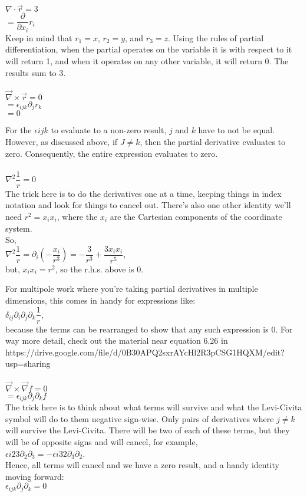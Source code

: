\documentclass[prb,preprint]
{revtex4-1}
\begin{document}
$\nabla \cdot \vec{r} = 3$\\
$= \dfrac{\partial}{\partial x_i} r_i$\\
Keep in mind that $r_1 = x$, $r_2 = y$, and $r_3 = z$.  Using the rules of partial differentiation, when the partial operates on the variable it is with respect to it will return 1, and when it operates on any other variable, it will return 0.  The results sum to 3.\\\\

$\vec{\nabla} \times \vec{r} = 0$\\
$=\epsilon_{ijk} \partial_j r_k$\\
$= 0$

For the $\epsilon{ijk}$ to evaluate to a non-zero result, $j$ and $k$ have to not be equal.  However, as discussed above, if $J \ne k$, then the partial derivative evaluates to zero.  Consequently, the entire expression evaluates to zero.
\\\\

$\nabla^2 \dfrac{1}{r} = 0$\\
The trick here is to do the derivatives one at a time, keeping things in index notation and look for things to cancel out.  There's also one other identity we'll need $r^2 = x_i x_i$, where the $x_i$ are the Cartesian components of the coordinate system.
\\
So,
\\
$\nabla^2 \dfrac{1}{r} = \partial_i \left(- \dfrac{x_i}{r^3}\right) = -\dfrac{3}{r^3} + \dfrac{3x_i x_i}{r^5}$,
\\
but, $x_i x_i = r^2$, so the r.h.s. above is 0.

For multipole work where you're taking partial derivatives in multiple dimensions, this comes in handy for expressions like:
\\
$\delta_{ij}\partial_i \partial_j \partial_k \dfrac{1}{r}$,
\\
because the terms can be rearranged to show that any such expression is 0.  For way more detail, check out the material near equation 6.26 in https://drive.google.com/file/d/0B30APQ2sxrAYcHl2R3pCSG1HQXM/edit?usp=sharing
\\\\

$\vec{\nabla} \times \vec{\nabla}f = 0$
\\
$= \epsilon_{ijk} \partial_j \partial_k f$
\\
The trick here is to think about what terms will survive and what the Levi-Civita symbol will do to them negative sign-wise.  Only pairs of derivatives where $j \ne k$ will survive the Levi-Civita.  There will be two of each of these terms, but they will be of opposite signs and will cancel, for example,
\\
$\epsilon{i23}\partial_2 \partial_3 = -\epsilon{i32}\partial_3 \partial_2$.
\\
Hence, all terms will cancel and we have a zero result, and a handy identity moving forward:
\\
$\epsilon_{ijk}\partial_j\partial_k = 0$
\\
\end{document}
